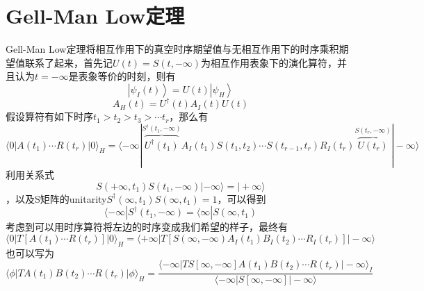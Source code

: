 \documentclass[10pt,openany]{book}
\theoremstyle{thmstyle} %
\theoremstyle{defstyle} %
\theoremstyle{prostyle} %
\begin{document}
\section{Gell-Man Low定理}
Gell-Man Low定理将相互作用下的真空时序期望值与无相互作用下的时序乘积期望值联系了起来，首先记$ U(t)=S(t,-\infty) $为相互作用表象下的演化算符，并且认为$ t=-\infty $是表象等价的时刻，则有
\begin{equation*}
  \left|\psi_I(t)\right\rangle=U(t)\left|\psi_H\right\rangle
\end{equation*} 
\begin{equation*}
  A_H(t)=U^{\dagger}(t) A_I(t) U(t)
\end{equation*}
假设算符有如下时序$ t_1>t_2>t_3>\cdots t_r $，那么有
\begin{equation*}
  \langle 0| A\left(t_1\right) \cdots R\left(t_r\right)|0\rangle_H=\langle-\infty| \overbrace{U^{\dagger}\left(t_1\right)}^{S^{\dagger}\left(t_1,-\infty\right)} A_I\left(t_1\right) S\left(t_1, t_2\right) \cdots S\left(t_{r-1}, t_r\right) R_I\left(t_r\right) \overbrace{U\left(t_r\right)}^{S\left(t_r,-\infty\right)}|-\infty\rangle
\end{equation*}
利用关系式
\begin{equation}
  S\left(+\infty, t_1\right) S\left(t_1,-\infty\right)|-\infty\rangle=|+\infty\rangle
  \label{VS}
\end{equation}
，以及S矩阵的unitarity$ S^{\dagger}\left(\infty, t_1\right) S\left(\infty, t_1\right)=1 $，可以得到
\begin{equation*}
  \langle-\infty| S^{\dagger}\left(t_1,-\infty\right)=\langle\infty| S\left(\infty, t_1\right)
\end{equation*} 
考虑到可以用时序算符将左边的时序变成我们希望的样子，最终有
\begin{equation*}
  \langle0| T\left[A\left(t_1\right) \cdots R\left(t_r\right)\right]|0\rangle_H=\langle+\infty| T\left[S(\infty,-\infty) A_I\left(t_1\right) B_I\left(t_2\right) \cdots R_I\left(t_r\right)\right]|-\infty\rangle
\end{equation*}
也可以写为
\begin{equation*}
  \langle\phi| T A\left(t_1\right) B\left(t_2\right) \cdots R\left(t_r\right)|\phi\rangle_H=\frac{\langle-\infty| T S[\infty,-\infty] A\left(t_1\right) B\left(t_2\right) \cdots R\left(t_r\right)|-\infty\rangle_I}{\langle-\infty| S[\infty,-\infty]|-\infty\rangle}
\end{equation*}  
\end{document}
